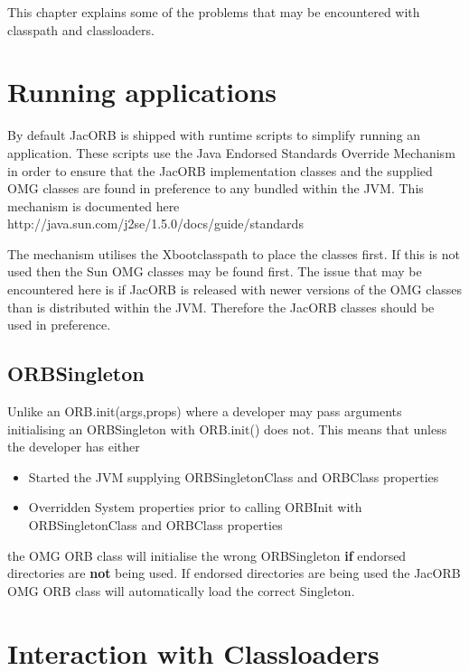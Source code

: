 %
%

This chapter explains some of the problems that may be encountered with classpath and classloaders.

\section{Running applications}

By default JacORB is shipped with runtime scripts to simplify running
an application.  These scripts use the Java Endorsed Standards
Override Mechanism in order to ensure that the JacORB implementation
classes and the supplied OMG classes are found in preference to any
bundled within the JVM. This mechanism is documented here
http://java.sun.com/j2se/1.5.0/docs/guide/standards


The mechanism utilises the Xbootclasspath to place the classes first. If
this is not used then the Sun OMG classes may be found first. The issue
that may be encountered here is if JacORB is released with newer versions 
of the OMG classes than is distributed within the JVM. Therefore the JacORB 
classes should be used in preference.


\subsection{ORBSingleton}
Unlike an ORB.init(args,props) where a developer may pass arguments initialising
an ORBSingleton with ORB.init() does not. This means that unless the developer has
either

\begin{itemize}
\item Started the JVM supplying ORBSingletonClass and ORBClass properties
\item Overridden System properties prior to calling ORBInit with ORBSingletonClass and ORBClass properties
\end{itemize}

 the OMG ORB class will initialise the wrong ORBSingleton \textbf{if} endorsed 
directories are \textbf{not} being used. If endorsed directories are being used
the JacORB OMG ORB class will automatically load the correct Singleton.


\section{Interaction with Classloaders}

